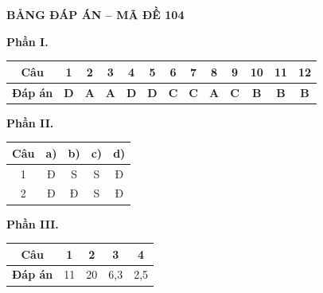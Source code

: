 
\vspace{0.3cm}
\noindent\begin{minipage}{\linewidth}
\begin{center}{\large\bfseries\color{red!80!black} BẢNG ĐÁP ÁN -- MÃ ĐỀ 104}\end{center}
\noindent\textbf{Phần I.}\par\smallskip
\begin{center}\begin{tabular}{|c|c|c|c|c|c|c|c|c|c|c|c|c|}\hline
\textbf{Câu} & 1 & 2 & 3 & 4 & 5 & 6 & 7 & 8 & 9 & 10 & 11 & 12 \\ \hline
\textbf{Đáp án} & \textbf{D} & \textbf{A} & \textbf{A} & \textbf{D} & \textbf{D} & \textbf{C} & \textbf{C} & \textbf{A} & \textbf{C} & \textbf{B} & \textbf{B} & \textbf{B} \\ \hline
\end{tabular}\end{center}
\noindent\textbf{Phần II.}\par\smallskip
\begin{center}\begin{tabular}{|c|c|c|c|c|}\hline
\textbf{Câu} & \textbf{a)} & \textbf{b)} & \textbf{c)} & \textbf{d)} \\ \hline
1 & Đ & S & S & Đ \\ \hline
2 & Đ & Đ & S & Đ \\ \hline
\end{tabular}\end{center}
\noindent\textbf{Phần III.}\par\smallskip
\begin{center}\begin{tabular}{|c|c|c|c|c|}\hline
\textbf{Câu} & 1 & 2 & 3 & 4 \\ \hline
\textbf{Đáp án} & 11 & 20 & 6,3 & 2,5 \\ \hline
\end{tabular}\end{center}
\end{minipage}
